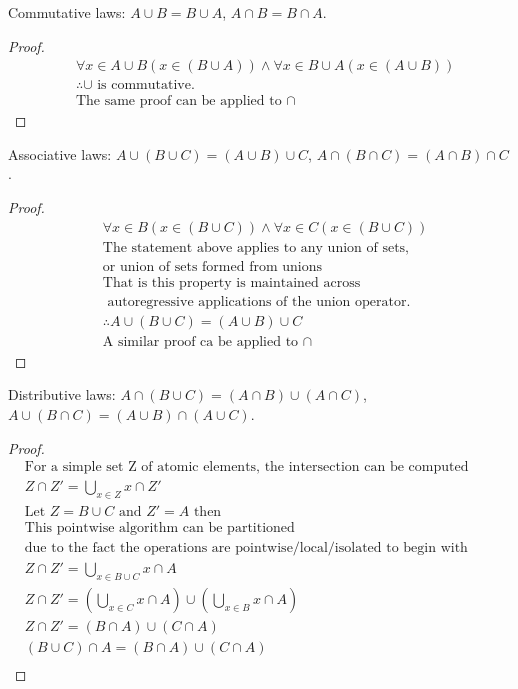 \begin{question}
  Commutative laws: $A \cup B = B \cup A$, $A \cap B = B \cap A$.
\end{question}
\begin{proof}
  \begin{align*}
    & \forall x \in A \cup B (x \in (B \cup A)) \land \forall x \in B \cup A (x \in (A \cup B)) \\
    & \therefore \cup \text{ is commutative.} \\
    & \text{The same proof can be applied to } \cap
  \end{align*}
\end{proof}

\begin{question}
  Associative laws: $A \cup (B \cup C) = (A \cup B) \cup C$, $A \cap (B \cap C) = (A \cap B) \cap C$.
\end{question}
\begin{proof}
  \begin{align*}
    & \forall x \in B(x \in (B \cup C)) \land \forall x \in C(x \in (B \cup C)) \\
    & \text{The statement above applies to any union of sets, } \\
    & \text{or union of sets formed from unions} \\
    & \text{That is this property is maintained across} \\
    & \text{ autoregressive applications of the union operator.} \\
    & \therefore A \cup (B \cup C) = (A \cup B) \cup C \\
    & \text{A similar proof ca be applied to } \cap
  \end{align*}
\end{proof}

\begin{question}
  Distributive laws: $A \cap (B \cup C) = (A \cap B) \cup (A \cap C)$, $A \cup (B \cap C) = (A \cup B) \cap (A \cup C)$.
\end{question}
\begin{proof}
  \begin{align*}
    & \text{For a simple set Z of atomic elements, the intersection can be computed pointwise} \\
    & Z \cap Z' = \bigcup_{x \in Z} {x} \cap Z' \\
    & \text{Let } Z = B \cup C \text{ and } Z' = A \text{ then} \\
    & \text{This pointwise algorithm can be partitioned} \\
    & \text{due to the fact the operations are pointwise/local/isolated to begin with} \\
    & Z \cap Z' = \bigcup_{x \in B \cup C} x \cap A \\
    & Z \cap Z' = (\bigcup_{x \in C} x \cap A) \cup (\bigcup_{x \in B} x \cap A) \\
    & Z \cap Z' = (B \cap A) \cup (C \cap A) \\
    & (B \cup C) \cap A = (B \cap A) \cup (C \cap A) \\
  \end{align*}
\end{proof}

